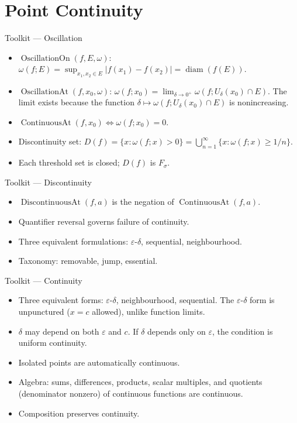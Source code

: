 
\section{Point Continuity}

\begin{toolkitbox}{Toolkit --- Oscillation}
\begin{itemize}
  \item $\operatorname{OscillationOn}(f,E,\omega)$:
    $\omega(f;E)=\sup_{x_1,x_2\in E}|f(x_1)-f(x_2)|=\operatorname{diam}(f(E))$.
  \item $\operatorname{OscillationAt}(f,x_0,\omega)$:
    $\omega(f;x_0)=\lim_{\delta\to 0^+}\omega(f;U_\delta(x_0)\cap E)$.
    The limit exists because the function $\delta\mapsto\omega(f;U_\delta(x_0)\cap E)$
    is nonincreasing.
  \item $\operatorname{ContinuousAt}(f,x_0)\iff\omega(f;x_0)=0$.
  \item Discontinuity set: $D(f)=\{x:\omega(f;x)>0\}=
    \bigcup_{n=1}^\infty\{x:\omega(f;x)\geq 1/n\}$.
  \item Each threshold set is closed; $D(f)$ is $F_\sigma$.
\end{itemize}
\end{toolkitbox}


\begin{toolkitbox}{Toolkit --- Discontinuity}
\begin{itemize}
  \item $\operatorname{DiscontinuousAt}(f,a)$ is the negation of $\operatorname{ContinuousAt}(f,a)$.
  \item Quantifier reversal governs failure of continuity.
  \item Three equivalent formulations: $\varepsilon$-$\delta$, sequential, neighbourhood.
  \item Taxonomy: removable, jump, essential.
\end{itemize}
\end{toolkitbox}


\begin{toolkitbox}{Toolkit --- Continuity}
\begin{itemize}
  \item Three equivalent forms: $\varepsilon$-$\delta$, neighbourhood,
    sequential. The $\varepsilon$-$\delta$ form is unpunctured
    ($x=c$ allowed), unlike function limits.
  \item $\delta$ may depend on both $\varepsilon$ and $c$.
    If $\delta$ depends only on $\varepsilon$, the condition is
    uniform continuity.
  \item Isolated points are automatically continuous.
  \item Algebra: sums, differences, products, scalar multiples,
    and quotients (denominator nonzero) of continuous functions
    are continuous.
  \item Composition preserves continuity.
\end{itemize}
\end{toolkitbox}





